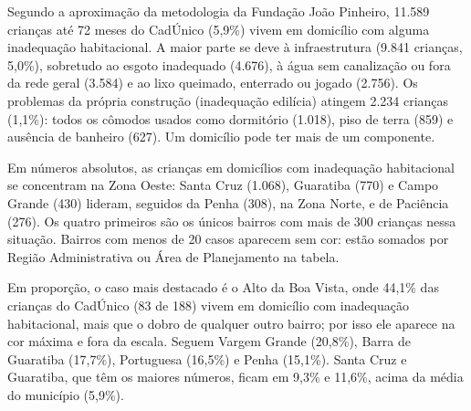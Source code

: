 
Segundo a aproximação da metodologia da Fundação João Pinheiro, 11.589 crianças até 72 meses do CadÚnico (5,9\%) vivem em domicílio com alguma inadequação habitacional. A maior parte se deve à infraestrutura (9.841 crianças, 5,0\%), sobretudo ao esgoto inadequado (4.676), à água sem canalização ou fora da rede geral (3.584) e ao lixo queimado, enterrado ou jogado (2.756). Os problemas da própria construção (inadequação edilícia) atingem 2.234 crianças (1,1\%): todos os cômodos usados como dormitório (1.018), piso de terra (859) e ausência de banheiro (627). Um domicílio pode ter mais de um componente.


Em números absolutos, as crianças em domicílios com inadequação habitacional se concentram na Zona Oeste: Santa Cruz (1.068), Guaratiba (770) e Campo Grande (430) lideram, seguidos da Penha (308), na Zona Norte, e de Paciência (276). Os quatro primeiros são os únicos bairros com mais de 300 crianças nessa situação. Bairros com menos de 20 casos aparecem sem cor: estão somados por Região Administrativa ou Área de Planejamento na tabela.


Em proporção, o caso mais destacado é o Alto da Boa Vista, onde 44,1\% das crianças do CadÚnico (83 de 188) vivem em domicílio com inadequação habitacional, mais que o dobro de qualquer outro bairro; por isso ele aparece na cor máxima e fora da escala. Seguem Vargem Grande (20,8\%), Barra de Guaratiba (17,7\%), Portuguesa (16,5\%) e Penha (15,1\%). Santa Cruz e Guaratiba, que têm os maiores números, ficam em 9,3\% e 11,6\%, acima da média do município (5,9\%).

